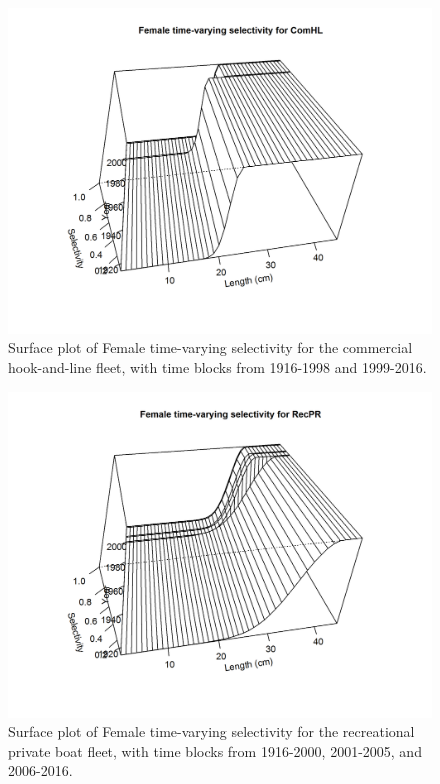 \documentclass[12pt,]{article}
\begin{document}
\begin{figure}[htbp]
\centering
\includegraphics{r4ss/plots_mod1/sel03_len_timevary_surf_flt1sex1.png}
\caption{Surface plot of Female time-varying selectivity for the
commercial hook-and-line fleet, with time blocks from 1916-1998 and
1999-2016. \label{fig:sel03_len_timevary_surf_flt1sex1}}
\end{figure}

\begin{figure}[htbp]
\centering
\includegraphics{r4ss/plots_mod1/sel03_len_timevary_surf_flt4sex1.png}
\caption{Surface plot of Female time-varying selectivity for the
recreational private boat fleet, with time blocks from 1916-2000,
2001-2005, and 2006-2016. \label{fig:sel03_len_timevary_surf_flt4sex1}}
\end{figure}
\end{document}
